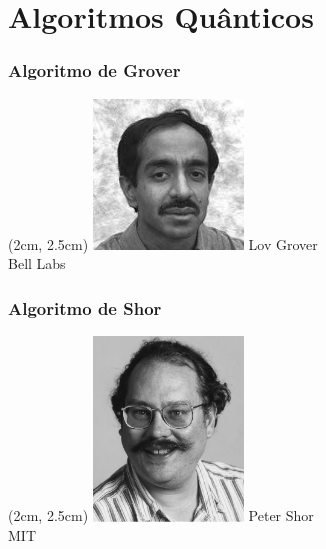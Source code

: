 \documentclass{beamer}
\begin{document}
	\frame%
	{
				
	}

	\frame%
	{
				
	}

	\section{Algoritmos Quânticos}
	
	\frame%
	{
		\frametitle{Algoritmo de Grover}
		
		\begin{textblock*}{4cm}(2cm, 2.5cm) %
			\includegraphics[width=4cm]{grover.jpg}
			Lov Grover\\
			{\centering\small Bell Labs}
		\end{textblock*}		
	}

	\frame%
	{
		\frametitle{Algoritmo de Shor}
		
		\begin{textblock*}{4cm}(2cm, 2.5cm) %
			\includegraphics[width=4cm]{shor.jpg}
			Peter Shor\\
			{\centering\small MIT}
		\end{textblock*}		
	}
	
	\frame%
	{
				
	}
	
	\frame%
	{
				
	}

	\frame%
	{
				
	}
	
	\frame%
	{
				
	}
	
	\frame%
	{
				
	}
	
	\frame%
	{
				
	}
\end{document}

